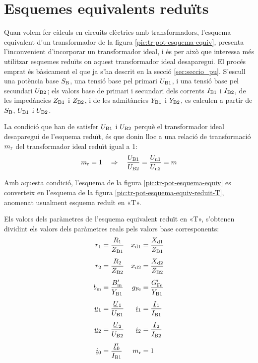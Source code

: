 \section{Esquemes equivalents reduïts}

Quan  volem fer càlculs en circuits elèctrics amb transformadors, l'esquema equivalent d'un transformador de la figura  \vref{pic:tr-pot-esquema-equiv}, presenta l'inconvenient d'incorporar un transformador ideal, i és per això que interessa més utilitzar esquemes reduïts on aquest transformador ideal desaparegui.
El procés emprat és bàsicament el que ja s'ha descrit en la secció \vref{sec:seccio_pu}. S'escull una potència base $S_\mathrm{B}$, una tensió base pel primari $U_\mathrm{B1}$, i una tensió base pel secundari $U_\mathrm{B2}$; els valors base de primari i secundari dels corrents $I_\mathrm{B1}$ i $I_\mathrm{B2}$, de les impedàncies $Z_\mathrm{B1}$ i $Z_\mathrm{B2}$, i de les admitàncies $Y_\mathrm{B1}$ i $Y_\mathrm{B2}$, es calculen a partir de $S_\mathrm{B}$, $U_\mathrm{B1}$ i $U_\mathrm{B2}$.

La condició que han de satisfer $U_\mathrm{B1}$ i $U_\mathrm{B2}$ perquè el transformador ideal desaparegui de l'esquema reduït, és que donin lloc a una relació de transformació $m_\mathrm{r}$ del transformador ideal reduït igual a  1:
\begin{equation}\label{eq:mr}
    m_\mathrm{r} = 1 \quad \Rightarrow \quad \frac{U_\mathrm{B1}}{U_\mathrm{B2}} = \frac{U_\mathrm{n1}}{U_\mathrm{n2}} = m
\end{equation}

 Amb aquesta condició, l'esquema de la figura \vref{pic:tr-pot-esquema-equiv} es converteix en l'esquema de la figura
\vref{pic:tr-pot-esquema-equiv-reduit-T}, anomenat usualment esquema reduït en «T».

\begin{center}
    
    \label{pic:tr-pot-esquema-equiv-reduit-T}
\end{center}

Els valors dels paràmetres de l'esquema equivalent reduït en «T», s'obtenen dividint els valors dels paràmetres reals pels valors base corresponents:
\begin{align}
    r\ped{1} &=\frac{R\ped{1}}{Z\ped{B1}} &   x\ped{d1} &=\frac{X\ped{d1}}{Z\ped{B1}} \\[1ex]
    r\ped{2} &=\frac{R\ped{2}}{Z\ped{B2}} &   x\ped{d2} &=\frac{X\ped{d2}}{Z\ped{B2}} \\[1ex]
    b\ped{m} &=\frac{B\ped{m}'}{Y\ped{B1}}  &   g\ped{Fe} &=\frac{G\ped{Fe}'}{Y\ped{B1}} \\[1ex]
    \cmplx{u}_1 &=\frac{\cmplx{U}_1}{U\ped{B1}} &   \cmplx{i}_1 &=\frac{\cmplx{I}_1}{I\ped{B1}} \\[1ex]
    \cmplx{u}_2 &=\frac{\cmplx{U}_2}{U\ped{B2}} &   \cmplx{i}_2 &=\frac{\cmplx{I}_2}{I\ped{B2}} \\[1ex]
    \cmplx{i}_0 &=\frac{\cmplx{I}_0'}{I\ped{B1}} &   m\ped{r} &=1
\end{align}

